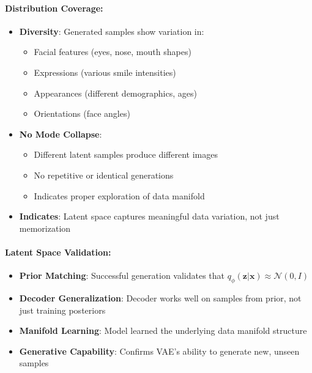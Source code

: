 \documentclass[conference]{IEEEtran}
\begin{document}
\paragraph{Distribution Coverage:}
\begin{itemize}
    \item \textbf{Diversity}: Generated samples show variation in:
    \begin{itemize}
        \item Facial features (eyes, nose, mouth shapes)
        \item Expressions (various smile intensities)
        \item Appearances (different demographics, ages)
        \item Orientations (face angles)
    \end{itemize}
    \item \textbf{No Mode Collapse}: 
    \begin{itemize}
        \item Different latent samples produce different images
        \item No repetitive or identical generations
        \item Indicates proper exploration of data manifold
    \end{itemize}
    \item \textbf{Indicates}: Latent space captures meaningful data variation, not just memorization
\end{itemize}

\paragraph{Latent Space Validation:}
\begin{itemize}
    \item \textbf{Prior Matching}: Successful generation validates that $q_\phi(\mathbf{z}|\mathbf{x}) \approx \mathcal{N}(0, I)$
    \item \textbf{Decoder Generalization}: Decoder works well on samples from prior, not just training posteriors
    \item \textbf{Manifold Learning}: Model learned the underlying data manifold structure
    \item \textbf{Generative Capability}: Confirms VAE's ability to generate new, unseen samples
\end{itemize}
\end{document}
